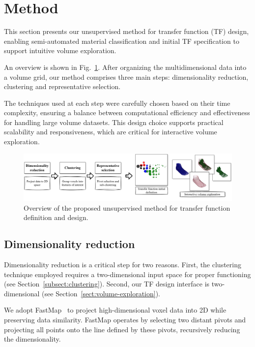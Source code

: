 \section{Method}
\label{sect:method}

This section presents our unsupervised method for transfer function (TF) design, enabling semi-automated material classification and initial TF specification to support intuitive volume exploration.

An overview is shown in Fig.~\ref{fig:volume-exploration-pipeline}. After organizing the multidimensional data into a volume grid, our method comprises three main steps: dimensionality reduction, clustering and representative selection. 

The techniques used at each step were carefully chosen based on their time complexity, ensuring a balance between computational efficiency and effectiveness for handling large volume datasets. This design choice supports practical scalability and responsiveness, which are critical for interactive volume exploration.


\begin{figure}[htb!]
    \centering
    \caption{Overview of the proposed unsupervised method for transfer function definition and design.}
    \label{fig:volume-exploration-pipeline}
    \includegraphics[width=\textwidth]{figs/method-overview.jpg}
\end{figure}

\subsection{Dimensionality reduction}
\label{subsect:feature-extraction}

Dimensionality reduction is a critical step for two reasons. First, the clustering technique employed requires a two-dimensional input space for proper functioning (see Section~\ref{subsect:clustering}). Second, our TF design interface is two-dimensional (see Section~\ref{sect:volume-exploration}).

We adopt FastMap~\cite{faloutsos1995} to project high-dimensional voxel data into 2D while preserving data similarity. FastMap operates by selecting two distant pivots and projecting all points onto the line defined by these pivots, recursively reducing the dimensionality.

